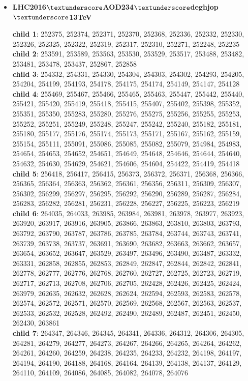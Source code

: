 \begin{itemize}
	\item \textbf{LHC2016$\textunderscore$AOD234$\textunderscore$deghjop$\textunderscore$13TeV} 

\textbf{child 1}: 252375, 252374, 252371, 252370, 252368, 252336, 252332, 252330, 252326, 252325, 252322, 252319, 252317, 252310, 252271, 252248, 252235 \\
\textbf{child 2}: 253591, 253589, 253563, 253530, 253529, 253517, 253488, 253482, 253481, 253478, 253437, 252867, 252858 \\
\textbf{child 3}: 254332, 254331, 254330, 254304, 254303, 254302, 254293, 254205, 254204, 254199, 254193, 254178, 254175, 254174, 254149, 254147, 254128 \\
\textbf{child 4}: 255469, 255467, 255466, 255465, 255463, 255447, 255442, 255440, 255421, 255420, 255419, 255418, 255415, 255407, 255402, 255398, 255352, 255351, 255350, 255283, 255280, 255276, 255275, 255256, 255255, 255253, 255252, 255251, 255249, 255248, 255247, 255242, 255240, 255182, 255181, 255180, 255177, 255176, 255174, 255173, 255171, 255167, 255162, 255159, 255154, 255111, 255091, 255086, 255085, 255082, 255079, 254984, 254983, 254654, 254653, 254652, 254651, 254649, 254648, 254646, 254644, 254640, 254632, 254630, 254629, 254621, 254606, 254604, 254422, 254419, 254418 \\
\textbf{child 5}: 256418, 256417, 256415, 256373, 256372, 256371, 256368, 256366, 256365, 256364, 256363, 256362, 256361, 256356, 256311, 256309, 256307, 256302, 256299, 256297, 256295, 256292, 256290, 256289, 256287, 256284, 256283, 256282, 256281, 256231, 256228, 256227, 256225, 256223, 256219 \\
\textbf{child 6}: 264035, 264033, 263985, 263984, 263981, 263978, 263977, 263923, 263920, 263917, 263916, 263905, 263866, 263863, 263810, 263803, 263793, 263792, 263790, 263787, 263786, 263785, 263784, 263744, 263743, 263741, 263739, 263738, 263737, 263691, 263690, 263682, 263663, 263662, 263657, 263654, 263652, 263647, 263529, 263497, 263496, 263490, 263487, 263332, 263331, 262858, 262855, 262853, 262849, 262847, 262844, 262842, 262841, 262778, 262777, 262776, 262768, 262760, 262727, 262725, 262723, 262719, 262717, 262713, 262708, 262706, 262705, 262428, 262426, 262425, 262424,  263979, 262635, 262632, 262628, 262624, 262594, 262593, 262583, 262578, 262574, 262572, 262571, 262570, 262569, 262568, 262567, 262563, 262537, 262533, 262532, 262528, 262492, 262490, 262489, 262487, 262451, 262450, 262430, 263861 \\
\textbf{child 7}: 264347, 264346, 264345, 264341, 264336, 264312, 264306, 264305, 264281, 264279, 264277, 264273, 264267, 264266, 264265, 264264, 264262, 264261, 264260, 264259, 264238, 264235, 264233, 264232, 264198, 264197, 264194, 264190, 264188, 264168, 264164, 264139, 264138, 264137, 264129, 264110, 264109, 264086, 264085, 264082, 264078, 264076
	

\end{itemize}
